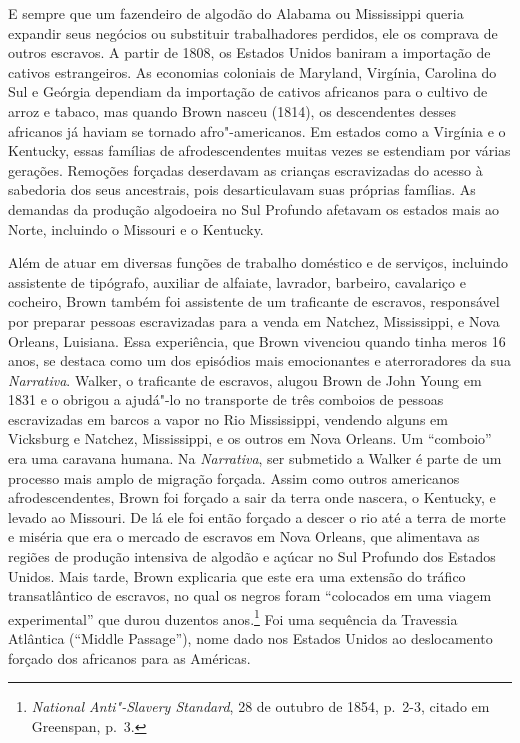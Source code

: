 E sempre que um fazendeiro de algodão do Alabama ou Mississippi queria
expandir seus negócios ou substituir trabalhadores perdidos, ele os
comprava de outros escravos. A partir de 1808, os Estados Unidos baniram
a importação de cativos estrangeiros. As economias coloniais de
Maryland, Virgínia, Carolina do Sul e Geórgia dependiam da importação de
cativos africanos para o cultivo de arroz e tabaco, mas quando Brown
nasceu (1814), os descendentes desses africanos já haviam se tornado
afro"-americanos. Em estados como a Virgínia e o Kentucky, essas famílias
de afrodescendentes muitas vezes se estendiam por várias gerações.
Remoções forçadas deserdavam as crianças escravizadas do acesso à
sabedoria dos seus ancestrais, pois desarticulavam suas próprias
famílias. As demandas da produção algodoeira no Sul Profundo afetavam os
estados mais ao Norte, incluindo o Missouri e o Kentucky.

Além de atuar em diversas funções de trabalho doméstico e de serviços,
incluindo assistente de tipógrafo, auxiliar de alfaiate, lavrador,
barbeiro, cavalariço e cocheiro, Brown também foi assistente de um
traficante de escravos, responsável por preparar pessoas escravizadas
para a venda em Natchez, Mississippi, e Nova Orleans, Luisiana. Essa
experiência, que Brown vivenciou quando tinha meros 16 anos, se destaca
como um dos episódios mais emocionantes e aterroradores da sua
\emph{Narrativa}. Walker, o traficante de escravos, alugou Brown de John
Young em 1831 e o obrigou a ajudá"-lo no transporte de três comboios de
pessoas escravizadas em barcos a vapor no Rio Mississippi, vendendo
alguns em Vicksburg e Natchez, Mississippi, e os outros em Nova Orleans.
Um ``comboio'' era uma caravana humana. Na \emph{Narrativa}, ser
submetido a Walker é parte de um processo mais amplo de migração
forçada. Assim como outros americanos afrodescendentes, Brown foi
forçado a sair da terra onde nascera, o Kentucky, e levado ao Missouri.
De lá ele foi então forçado a descer o rio até a terra de morte e
miséria que era o mercado de escravos em Nova Orleans, que alimentava as
regiões de produção intensiva de algodão e açúcar no Sul Profundo dos
Estados Unidos. Mais tarde, Brown explicaria que este era uma extensão
do tráfico transatlântico de escravos, no qual os negros foram
``colocados em uma viagem experimental'' que durou duzentos
anos.\footnote{\emph{National Anti"-Slavery Standard}, 28 de outubro de
  1854, p.~2-3, citado em Greenspan, p.~3.} Foi uma sequência da Travessia
Atlântica (``Middle Passage''), nome dado nos Estados Unidos ao
deslocamento forçado dos africanos para as Américas.

